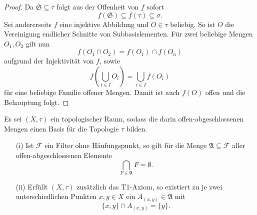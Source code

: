 \begin{proof}
  Da $\mathfrak{S} \subseteq \tau$ folgt aus der Offenheit von $f$ sofort 
  \begin{displaymath}
    f(\mathfrak{S}) \subseteq f(\tau) \subseteq \sigma.
  \end{displaymath}
  Sei andererseits $f$ eine injektive Abbildung und $O \in \tau$ beliebig.
  So ist $O$ die Vereinigung endlicher Schnitte von Subbasislementen.
  Für zwei beliebige Mengen $O_1,O_2$ gilt nun 
  \begin{displaymath}
    f(O_1 \cap O_2) = f(O_1) \cap f(O_n)
  \end{displaymath}
  aufgrund der Injektivität von $f$, sowie 
  \begin{displaymath}
    f \left(\bigcup_{i \in I} O_i \right) = \bigcup_{i \in I} f(O_i)
  \end{displaymath}
  für eine beliebige Familie offener Mengen.
  Damit ist auch $f(O)$ offen und die Behauptung folgt.
\end{proof}

\begin{lem}
  \label{lem:filterclusterpoint}
  Es sei $(X,\tau)$ ein topologischer Raum, sodass die darin offen-abgeschlossenen Mengen einen Basis für die Topologie $\tau$ bilden.

  \begin{itemize}
    \item[(i)] Ist $\mathcal{F}$ ein Filter ohne Häufungspunkt, so gilt für die Menge $\mathfrak{A} \subseteq \mathcal{F}$ aller offen-abgeschlossenen Elemente 
     \begin{displaymath}
       \bigcap_{F \in \mathfrak{A}} F = \emptyset.
     \end{displaymath}
   \item[(ii)] Erfüllt $(X,\tau)$ zusätzlich das T1-Axiom, so existiert zu je zwei unterschiedlichen Punkten $x,y \in X$ ein $A_{(x,y)} \in \mathfrak{A}$ mit 
     \begin{displaymath}
       \{x,y\} \cap A_{(x,y)} = \{y\}.
     \end{displaymath}
  \end{itemize}
\end{lem}

